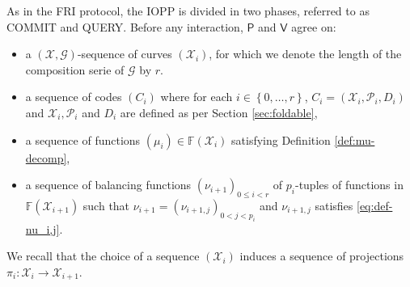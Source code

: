 \documentclass[10pt,a4paper]{article}
\newcommand\F{\mathbb{F}}
\newcommand\prover{\mathsf{P}}
\newcommand\verifier{\mathsf{V}}
\renewcommand{\vec}[1]{\boldsymbol{#1}}
\newcommand{\set}[1]{\left\{#1\right\}}
\newcommand\calX{\mathcal{X}}
\newcommand\calP{\mathcal{P}}
\newcommand\calG{\mathcal{G}}
\newcommand\XGseq{(\calX, \vec{\calG})}
\theoremstyle{plain}
\theoremstyle{plain}
\theoremstyle{definition}
\theoremstyle{remark}
\theoremstyle{plain}
\begin{document}
As in the \textsf{FRI} protocol, the IOPP is divided in two phases, referred to as \textsf{COMMIT} and \textsf{QUERY}. 
Before any interaction, $\prover$ and $\verifier$ agree on:
\begin{itemize}
	\item a $\XGseq$-sequence of curves $(\calX_i)$, for which we denote the length of the composition serie of $\calG$ by $r$.
	\item a sequence of codes $(C_i)$ where for each $i \in \set{0, \dots, r}$, $C_i = (\calX_i, \calP_i, D_i)$ and $\calX_i, \calP_i$ and $D_i$ are defined as per Section \ref{sec:foldable},
	\item a sequence of functions $(\mu_i) \in \F(\calX_i)$ satisfying Definition \ref{def:mu-decomp},
	\item a sequence of balancing functions $(\nu_{i+1})_{0 \le i < r}$ of $p_i$-tuples of functions in $\F(\calX_{i+1})$ such that $\nu_{i+1} = (\nu_{i+1, j})_{0 < j < p_i}$ and $\nu_{i+1, j}$ satisfies \eqref{eq:def-nu_i,j}.
\end{itemize}
We recall that the choice of a sequence $(\calX_i)$ induces a sequence of projections $\pi_i : \calX_i \rightarrow \calX_{i+1}$.
\end{document}
